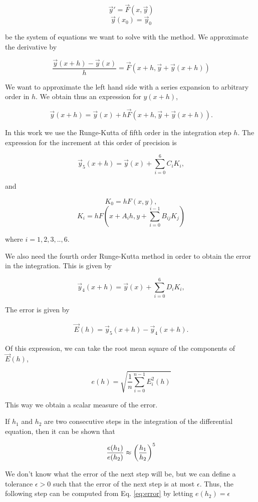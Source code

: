 $$\vec{y}' = \vec{F}(x, \vec{y})$$
$$\vec{y}(x_0) = \vec{y}_0$$

be the system of equations we want to solve with the method. We approximate the derivative by

$$\frac{\vec{y}(x+h)-\vec{y}(x)}{h} = \vec{F}(x + h, \vec{y}+\vec{y}(x+h))$$

We want to approximate the left hand side with a series expansion to arbitrary order in $h$. We obtain thus an expression for $y(x+h)$,

$$\vec{y}(x+h)=\vec{y}(x)+ h\vec{F}(x + h, \vec{y}+\vec{y}(x+h)).$$

In this work we use the Runge-Kutta of fifth order in the integration step $h$. The expression for the increment at this order of precision is

$$\vec{y}_5(x+h) = \vec{y}(x) + \sum_{i=0}^{6} C_{i} K_i,$$

and

$$K_0 = hF(x,y),$$
$$K_i = hF(x+A_ih,y+\sum_{i=0}^{i-1} B_{ij} K_j)$$

where $i = 1,2,3, .. , 6 $.

We also need the fourth order Runge-Kutta method in order to obtain the error in the integration. This is given by

$$\vec{y}_4(x+h) = \vec{y}(x) + \sum_{i=0}^{6} D_{i} K_i,$$

The error is given by 

\begin{eqnarray}
\vec{E}(h) = \vec{y}_5(x+h) - \vec{y}_4(x+h).
\end{eqnarray}

Of this expression, we can take the root mean square of the components of $\vec{E}(h)$,

\begin{equation}
e(h) = \sqrt{\frac{1}{n}\sum_{i=0}^{n-1}E_i^2(h)}
\end{equation}

This way we obtain a scalar measure of the error.

If $h_1$ and $h_2$ are two consecutive steps in the integration of the differential equation, then it can be shown that

\begin{equation}
\frac{e(h_1)}{e(h_2)} \approx \left({\frac{h_1}{h_2}}\right)^5
\label{eq:error}
\end{equation}

We don't know what the error of the next step will be, but we can define a tolerance $\epsilon>0$ such that the error of the next step is at most $\epsilon$. Thus, the following step can be computed from Eq. \ref{eq:error} by letting $e(h_2) = \epsilon$


